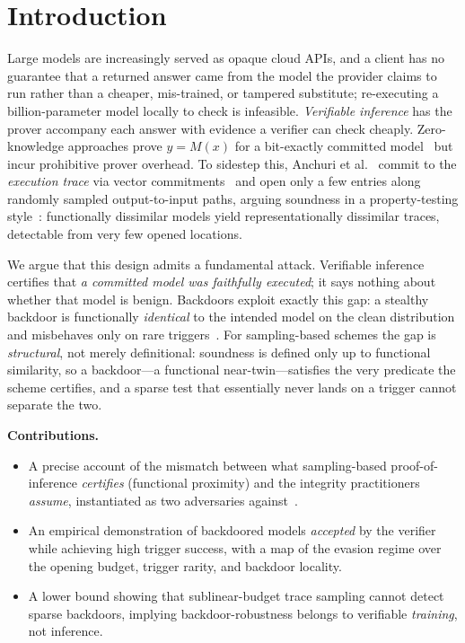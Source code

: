 \documentclass[sigconf,nonacm]{acmart}
\begin{document}
\section{Introduction}
Large models are increasingly served as opaque cloud APIs, and a client has no guarantee that
a returned answer came from the model the provider claims to run rather than a cheaper,
mis-trained, or tampered substitute; re-executing a billion-parameter model locally to check
is infeasible. \emph{Verifiable inference} has the prover accompany each answer with evidence
a verifier can check cheaply. Zero-knowledge approaches prove $y=M(x)$ for a bit-exactly
committed model~\cite{kang2022scaling,benno2026jolt} but incur prohibitive prover overhead. To
sidestep this, Anchuri et al.~\cite{anchuri2026verifiable} commit to the \emph{execution trace}
via vector commitments~\cite{catalano2013vector} and open only a few entries along
randomly sampled output-to-input paths, arguing soundness in a property-testing
style~\cite{goldreich2017property}: functionally dissimilar models yield representationally
dissimilar traces, detectable from very few opened locations.

We argue that this design admits a fundamental attack. Verifiable inference certifies that
\emph{a committed model was faithfully executed}; it says nothing about whether that model is
benign. Backdoors exploit exactly this gap: a stealthy backdoor is functionally \emph{identical}
to the intended model on the clean distribution and misbehaves only on rare
triggers~\cite{gu2019badnets,saha2020hidden}. For sampling-based schemes the gap is
\emph{structural}, not merely definitional: soundness is defined only up to functional
similarity, so a backdoor---a functional near-twin---satisfies the very predicate the scheme
certifies, and a sparse test that essentially never lands on a trigger cannot separate the two.

\noindent\textbf{Contributions.}
\begin{itemize}
  \item A precise account of the mismatch between what sampling-based proof-of-inference
  \emph{certifies} (functional proximity) and the integrity practitioners \emph{assume},
  instantiated as two adversaries against~\cite{anchuri2026verifiable}.
  \item An empirical demonstration of backdoored models \emph{accepted} by the verifier while
  achieving high trigger success, with a map of the evasion regime over the opening budget, trigger
  rarity, and backdoor locality.
  \item A lower bound showing that sublinear-budget trace sampling cannot detect sparse
  backdoors, implying backdoor-robustness belongs to verifiable \emph{training}, not inference.
\end{itemize}
\end{document}
